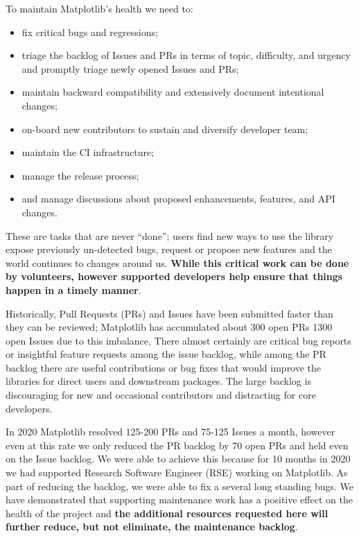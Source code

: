\documentclass[12pt]{article}
\numberwithin{page}{section}
\begin{document}
To maintain Matplotlib's health we need to:
\begin{itemize}[noitemsep]
\item fix critical bugs and regressions;
\item triage the backlog of Issues and PRs in terms of topic,
  difficulty, and urgency and promptly triage newly opened Issues and
  PRs;
\item maintain backward compatibility and extensively document
  intentional changes;
\item on-board new contributors to sustain and diversify developer
  team;
\item maintain the CI infrastructure;
\item manage the release process;
\item and manage discussions about proposed enhancements, features,
  and API changes.
\end{itemize}
These are tasks that are never ``done''; users find new ways to use
the library expose previously un-detected bugs, request or propose new
features and the world continues to changes around us.  \textbf{While
  this critical work can be done by volunteers, however supported
  developers help ensure that things happen in a timely manner}.






Historically, Pull Requests (PRs) and Issues have been submitted
faster than they can be reviewed; Matplotlib has accumulated about 300
open PRs 1300 open Issues due to this imbalance, There almost
certainly are critical bug reports or insightful feature requests among
the issue backlog, while among the PR backlog there are useful contributions
or bug fixes that would improve the libraries for direct users and
downstream packages.  The large backlog is discouraging for new and
occasional contributors and distracting for core developers.

In 2020 Matplotlib resolved 125-200 PRs and 75-125 Issues a month,
however even at this rate we only reduced the PR backlog by 70 open
PRs and held even on the Issue backlog.  We were able to achieve this
because for 10 months in 2020 we had supported Research Software
Engineer (RSE) working on Matplotlib.  As part of reducing the
backlog, we were able to fix a several long standing bugs.  We have
demonstrated that supporting maintenance work has a positive effect on
the health of the project and \textbf{the additional resources
  requested here will further reduce, but not eliminate, the
  maintenance backlog}.
\end{document}
